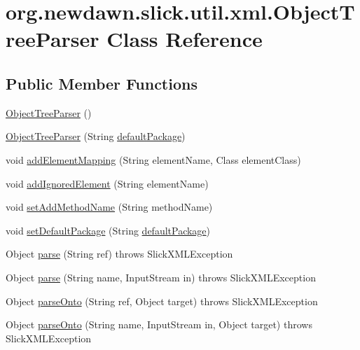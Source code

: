 \hypertarget{classorg_1_1newdawn_1_1slick_1_1util_1_1xml_1_1_object_tree_parser}{}\section{org.\+newdawn.\+slick.\+util.\+xml.\+Object\+Tree\+Parser Class Reference}
\label{classorg_1_1newdawn_1_1slick_1_1util_1_1xml_1_1_object_tree_parser}
\subsection*{Public Member Functions}
\begin{DoxyCompactItemize}
\item 
\mbox{\hyperlink{classorg_1_1newdawn_1_1slick_1_1util_1_1xml_1_1_object_tree_parser_af4c8c1f09a9c56dce175cb70e9a57926}{Object\+Tree\+Parser}} ()
\item 
\mbox{\hyperlink{classorg_1_1newdawn_1_1slick_1_1util_1_1xml_1_1_object_tree_parser_a8e6ee678892b8b9f6b2547c12b6a0317}{Object\+Tree\+Parser}} (String \mbox{\hyperlink{classorg_1_1newdawn_1_1slick_1_1util_1_1xml_1_1_object_tree_parser_ab71da775b688ffcb01dd17456a4013bb}{default\+Package}})
\item 
void \mbox{\hyperlink{classorg_1_1newdawn_1_1slick_1_1util_1_1xml_1_1_object_tree_parser_a03026019c9ab19b319fb0ef0ce32217e}{add\+Element\+Mapping}} (String element\+Name, Class element\+Class)
\item 
void \mbox{\hyperlink{classorg_1_1newdawn_1_1slick_1_1util_1_1xml_1_1_object_tree_parser_a309e9f0ca0c24b6cb4120da36f3ddf9d}{add\+Ignored\+Element}} (String element\+Name)
\item 
void \mbox{\hyperlink{classorg_1_1newdawn_1_1slick_1_1util_1_1xml_1_1_object_tree_parser_a378493da252c061831b9df7f8269d34c}{set\+Add\+Method\+Name}} (String method\+Name)
\item 
void \mbox{\hyperlink{classorg_1_1newdawn_1_1slick_1_1util_1_1xml_1_1_object_tree_parser_a3257fc35ecae8f9c27bbdc9cd2b489b2}{set\+Default\+Package}} (String \mbox{\hyperlink{classorg_1_1newdawn_1_1slick_1_1util_1_1xml_1_1_object_tree_parser_ab71da775b688ffcb01dd17456a4013bb}{default\+Package}})
\item 
Object \mbox{\hyperlink{classorg_1_1newdawn_1_1slick_1_1util_1_1xml_1_1_object_tree_parser_a0e937d050a1ad0e58e24465f87ac5eee}{parse}} (String ref)  throws Slick\+X\+M\+L\+Exception 
\item 
Object \mbox{\hyperlink{classorg_1_1newdawn_1_1slick_1_1util_1_1xml_1_1_object_tree_parser_ad4fb701b5ad924401683319443407f2e}{parse}} (String name, Input\+Stream in)  throws Slick\+X\+M\+L\+Exception 
\item 
Object \mbox{\hyperlink{classorg_1_1newdawn_1_1slick_1_1util_1_1xml_1_1_object_tree_parser_ae2b6f03bcd08a6968a300f58e0b24f2e}{parse\+Onto}} (String ref, Object target)  throws Slick\+X\+M\+L\+Exception 
\item 
Object \mbox{\hyperlink{classorg_1_1newdawn_1_1slick_1_1util_1_1xml_1_1_object_tree_parser_a2196c40ecd24a4cc73b3471bcc44a682}{parse\+Onto}} (String name, Input\+Stream in, Object target)  throws Slick\+X\+M\+L\+Exception 
\end{DoxyCompactItemize}
